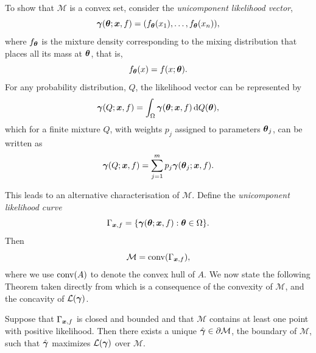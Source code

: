 	To show that $\mathcal{M}$ is a convex set, consider the \emph{unicomponent likelihood vector},
	\begin{equation}
		{\bm{{\gamma}}}({\bm{{\theta}}}; {\bm{{x}}}, f) = (f_{\bm{{\theta}}}(x_1), \dots, f_{\bm{{\theta}}}(x_n)),
	\end{equation}
	where $f_{\bm{{\theta}}}$ is the mixture density corresponding to the mixing distribution that places all its mass at ${\bm{{\theta}}}$, that is, 
	\begin{equation}
		f_{\bm{{\theta}}}(x) = f(x; {\bm{{\theta}}}).
	\end{equation}
	For any probability distribution, $Q$, the likelihood vector can be represented by
	\begin{equation}
		{\bm{{\gamma}}}(Q; {\bm{{x}}}, f) = \int_\Omega {\bm{{\gamma}}}({\bm{{\theta}}}; {\bm{{x}}}, f) \, \mathrm{d} Q({\bm{{\theta}}}),
	\end{equation}
	which for a finite mixture $Q$, with weights $p_j$ assigned to parameters ${\bm{{\theta}}}_j$, can be written as
	\begin{equation}
		{\bm{{\gamma}}}(Q;{\bm{{x}}},f) = \sum_{j = 1}^m p_j {\bm{{\gamma}}}({\bm{{\theta}}}_j; {\bm{{x}}}, f).
	\end{equation}
	
	This leads to an alternative characterisation of $\mathcal{M}$. Define the \emph{unicomponent likelihood curve}
	\begin{equation}
		\Gamma_{{\bm{{x}}}, f} = \{{\bm{{\gamma}}}({\bm{{\theta}}}; {\bm{{x}}}, f) : {\bm{{\theta}}} \in \Omega\}.
	\end{equation}
	Then
	\begin{equation}
		\mathcal{M} = \mathrm{conv}(\Gamma_{{\bm{{x}}}, f}),
	\end{equation}
	where we use $\mathrm{conv}(A)$ to denote the convex hull of $A$. We now state the following Theorem taken directly from \cite[Theorem 18]{Lindsay1995-sq} which is a consequence of the convexity of $\mathcal{M}$, and the concavity of $\mathcal{L}({\bm{{\gamma}}})$.

	\begin{theorem}
		Suppose that $\Gamma_{{\bm{{x}}}, f}$ is closed and bounded and that $\mathcal{M}$ contains at least one point with positive likelihood. Then there exists a unique $\hat{{\bm{{\gamma}}}} \in \partial \mathcal{M}$, the boundary of $\mathcal{M}$, such that $\hat{{\bm{{\gamma}}}}$ maximizes $\mathcal{L}({\bm{{\gamma}}})$ over $\mathcal{M}$.
		\label{thm: lindsay maximizing likelihood vector point}
	\end{theorem}

